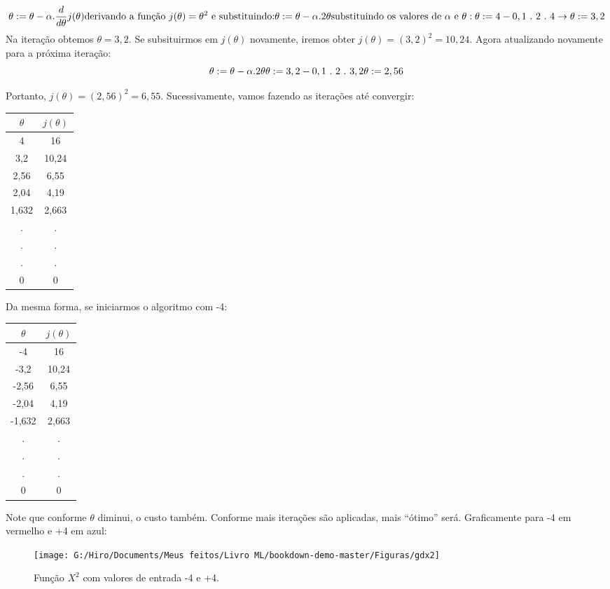 \documentclass[
]{book}
\begin{document}
\[\theta := \theta-\alpha.\frac{d}{d\theta}j(\theta) \\ 
\mbox{derivando a função} \ j(\theta)=\theta^2 \ \mbox{e substituindo:}
\\ \theta:= \theta -\alpha.2\theta \\ \mbox{substituindo os valores de}\ \alpha\ \mbox{e}\ \theta: \\ \theta:=4-0,1 \ .\ 2\ .\ 4 \\
\rightarrow \theta:=3,2
\]
Na iteração obtemos \(\theta=3,2\). Se subsituirmos em \(j(\theta)\) novamente, iremos obter \(j(\theta)=(3,2)^2=10,24\). Agora atualizando novamente para a próxima iteração:
\[\theta:= \theta -\alpha.2\theta \\ \theta:=3,2-0,1\ .\ 2\ .\ 3,2 \\
\theta:= 2,56\]

Portanto, \(j(\theta)=(2,56)^2=6,55\). Sucessivamente, vamos fazendo as iterações até convergir:

\begin{longtable}[]{@{}cc@{}}
\toprule
\textbf{\(\theta\)} & \textbf{\(j(\theta)\)}\tabularnewline
\midrule
\endhead
4 & 16\tabularnewline
3,2 & 10,24\tabularnewline
2,56 & 6,55\tabularnewline
2,04 & 4,19\tabularnewline
1,632 & 2,663\tabularnewline
. & .\tabularnewline
. & .\tabularnewline
. & .\tabularnewline
0 & 0\tabularnewline
\bottomrule
\end{longtable}

Da mesma forma, se iniciarmos o algoritmo com -4:

\begin{longtable}[]{@{}cc@{}}
\toprule
\textbf{\(\theta\)} & \textbf{\(j(\theta)\)}\tabularnewline
\midrule
\endhead
-4 & 16\tabularnewline
-3,2 & 10,24\tabularnewline
-2,56 & 6,55\tabularnewline
-2,04 & 4,19\tabularnewline
-1,632 & 2,663\tabularnewline
. & .\tabularnewline
. & .\tabularnewline
. & .\tabularnewline
0 & 0\tabularnewline
\bottomrule
\end{longtable}

Note que conforme \(\theta\) diminui, o custo também. Conforme mais iterações são aplicadas, mais ``ótimo'' será. Graficamente para -4 em vermelho e +4 em azul:

\begin{figure}

{\centering \texttt{[image: G:/Hiro/Documents/Meus feitos/Livro ML/bookdown-demo-master/Figuras/gdx2]} 

}

\caption{Função \(X^2\) com valores de entrada -4 e +4.}\label{fig:gdx2}
\end{figure}
\end{document}
